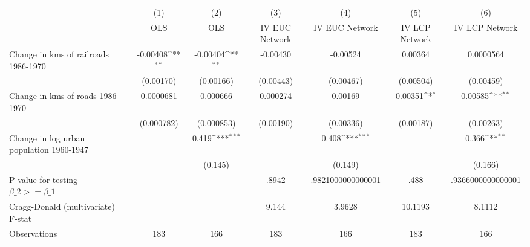 {
\def\sym#1{\ifmmode^{#1}\else\(^{#1}\)\fi}
\begin{tabular}{l*{6}{c}}
\hline\hline
                &\multicolumn{1}{c}{(1)}&\multicolumn{1}{c}{(2)}&\multicolumn{1}{c}{(3)}&\multicolumn{1}{c}{(4)}&\multicolumn{1}{c}{(5)}&\multicolumn{1}{c}{(6)}\\
                &\multicolumn{1}{c}{OLS}&\multicolumn{1}{c}{OLS}&\multicolumn{1}{c}{IV EUC Network}&\multicolumn{1}{c}{IV EUC Network}&\multicolumn{1}{c}{IV LCP Network}&\multicolumn{1}{c}{IV LCP Network}\\
\hline
Change in kms of railroads 1986-1970& -0.00408\sym{**} & -0.00404\sym{**} & -0.00430         & -0.00524         &  0.00364         &0.0000564         \\
                &(0.00170)         &(0.00166)         &(0.00443)         &(0.00467)         &(0.00504)         &(0.00459)         \\
[1em]
Change in kms of roads 1986-1970&0.0000681         & 0.000666         & 0.000274         &  0.00169         &  0.00351\sym{*}  &  0.00585\sym{**} \\
                &(0.000782)         &(0.000853)         &(0.00190)         &(0.00336)         &(0.00187)         &(0.00263)         \\
[1em]
Change in log urban population 1960-1947&                  &    0.419\sym{***}&                  &    0.408\sym{***}&                  &    0.366\sym{**} \\
                &                  &  (0.145)         &                  &  (0.149)         &                  &  (0.166)         \\
\hline
P-value for testing $\beta\_{2} >= \beta\_{1}$&                  &                  &    .8942         &.9821000000000001         &     .488         &.9366000000000001         \\
Cragg-Donald (multivariate) F-stat&                  &                  &    9.144         &   3.9628         &  10.1193         &   8.1112         \\
Observations    &      183         &      166         &      183         &      166         &      183         &      166         \\
\hline\hline
\end{tabular}
}
